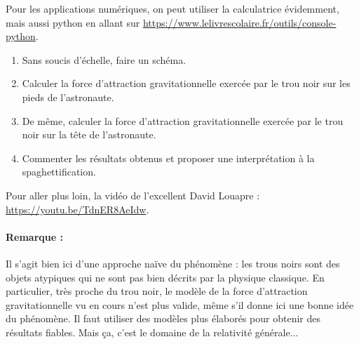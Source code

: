 \documentclass[12pt,a4paper,fleqn]{article}
\begin{document}
Pour les applications numériques, on peut utiliser la calculatrice évidemment, mais aussi python en allant sur \href{https://www.lelivrescolaire.fr/outils/console-python}{https://www.lelivrescolaire.fr/outils/console-python}.

\begin{enumerate}
\item Sans soucis d'échelle, faire un schéma.

\item Calculer la force d'attraction gravitationnelle exercée par le trou noir sur les pieds de l'astronaute.

\item De même, calculer la force d'attraction gravitationnelle exercée par le trou noir sur la tête de l'astronaute.

\item Commenter les résultats obtenus et proposer une interprétation à la spaghettification.
\end{enumerate}

Pour aller plus loin, la vidéo de l'excellent David Louapre : \href{https://youtu.be/TdnER8AeIdw}{https://youtu.be/TdnER8AeIdw}.

\paragraph{Remarque :}
Il s'agit bien ici d'une approche naïve du phénomène : les trous noirs sont des objets atypiques qui ne sont pas bien décrits par la physique classique.
En particulier, très proche du trou noir, le modèle de la force d'attraction gravitationnelle vu en cours n'est plus valide, même s'il donne ici une bonne idée du phénomène.
Il faut utiliser des modèles plus élaborés pour obtenir des résultats fiables.
Mais ça, c'est le domaine de la relativité générale...
\end{document}

